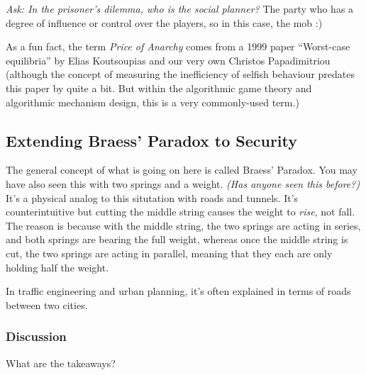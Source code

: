 \documentclass[11pt]{article}
\begin{document}
{\it Ask: In the prisoner's dilemma, who is the social planner?} The party who has a degree of influence or control over the players, so in this case, the mob :) 

As a fun fact, the term {\it Price of Anarchy} comes from a 1999 paper ``Worst-case equilibria'' by  Elias Koutsoupias and our very own Christos Papadimitriou (although the concept of measuring the inefficiency of selfish behaviour predates this paper by quite a bit. But within the algorithmic game theory and algorithmic mechanism design, this is a very commonly-used term.)

\subsection{Extending Braess' Paradox to Security}

The general concept of what is going on here is called Braess' Paradox. 
You may have also seen this with two springs and a weight. {\it(Has anyone seen this before?)} It's a physical analog to this situtation with roads and tunnels. 
It's counterintuitive but cutting the middle string causes the weight to {\it rise}, not fall. 
The reason is because with the middle string, the two springs are acting in series, and both springs are bearing the full weight, whereas once the middle string is cut, the two springs are acting in parallel, meaning that they each are only holding half the weight. 

In traffic engineering and urban planning, it's often explained in terms of roads between two cities.



\subsubsection{Discussion}

What are the takeaways?
\end{document}
